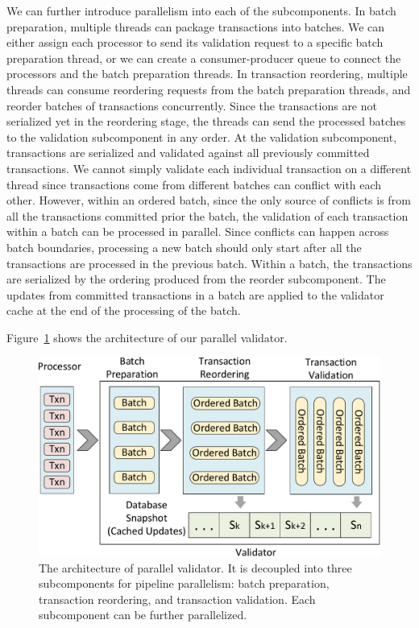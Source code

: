 We can further introduce parallelism into each of the subcomponents. In batch preparation, multiple threads can package transactions into batches. We can either assign each processor to send its validation request to a specific batch preparation thread, or we can create a consumer-producer queue to connect the processors and the batch preparation threads. In transaction reordering, multiple threads can consume reordering requests from the batch preparation threads, and reorder batches of transactions concurrently. Since the transactions are not serialized yet in the reordering stage, the threads can send the processed batches to the validation subcomponent in any order. At the validation subcomponent, transactions are serialized and validated against all previously committed transactions. We cannot simply validate each individual transaction on a different thread since transactions come from different batches can conflict with each other. However, within an ordered batch, since the only source of conflicts is from all the transactions committed prior the batch, the validation of each transaction within a batch can be processed in parallel. Since conflicts can happen across batch boundaries, processing a new batch should only start after all the transactions are processed in the previous batch. Within a batch, the transactions are serialized by the ordering produced from the reorder subcomponent. The updates from committed transactions in a batch are applied to the validator cache at the end of the processing of the batch. 

Figure~\ref{fig:reorder:validator} shows the architecture of our parallel validator. 

\begin{figure}[t]
	\centering
	\includegraphics[width=1\columnwidth]{./figures/validator}
	\vspace{-2em}
	\caption{The architecture of parallel validator. It is decoupled into three subcomponents for pipeline parallelism: batch preparation, transaction reordering, and transaction validation. Each subcomponent can be further parallelized.}
	\vspace{-1em}
	\label{fig:reorder:validator}
\end{figure}


